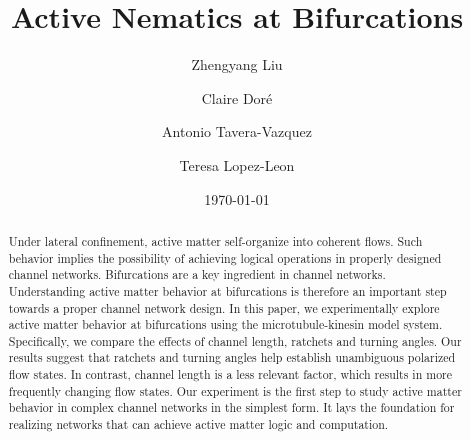 \documentclass[%
10pt,
superscriptaddress,
twocolumn,
 amsmath,amssymb,
 aps,prx,
]{revtex4-2}
\begin{document}

\title{Active Nematics at Bifurcations}%



\author{Zhengyang Liu}
\author{Claire Doré}

\author{Antonio Tavera-Vazquez}

\author{Teresa Lopez-Leon}
\date{\today}




\begin{abstract}

Under lateral confinement, active matter self-organize into coherent flows. 
Such behavior implies the possibility of achieving logical operations in properly designed channel networks. 
Bifurcations are a key ingredient in channel networks.
Understanding active matter behavior at bifurcations is therefore an important step towards a proper channel network design.
In this paper, we experimentally explore active matter behavior at bifurcations using the microtubule-kinesin model system. 
Specifically, we compare the effects of channel length, ratchets and turning angles. 
Our results suggest that ratchets and turning angles help establish unambiguous polarized flow states.
In contrast, channel length is a less relevant factor, which results in more frequently changing flow states.
Our experiment is the first step to study active matter behavior in complex channel networks in the simplest form.
It lays the foundation for realizing networks that can achieve active matter logic and computation.

\end{abstract}

\maketitle
\end{document}
